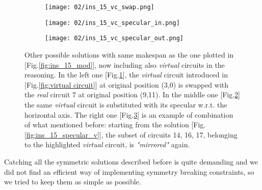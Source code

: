         \begin{figure}[H]
            \centering
            \begin{subfigure}[b]{0.3\textwidth}
                \centering 
                \texttt{[image: 02/ins\_15\_vc\_swap.png]}
                \caption{}
                \label{fig:vc_swap}
            \end{subfigure}
            \hfill
            \begin{subfigure}[b]{0.3\textwidth}
                \centering
                \texttt{[image: 02/ins\_15\_vc\_specular\_in.png]}
                \caption{}
                \label{fig:vc_specular_in}
            \end{subfigure}
            \hfill
            \begin{subfigure}[b]{0.3\textwidth}
                \centering
                \texttt{[image: 02/ins\_15\_vc\_specular\_out.png]}
                \caption{}
                \label{fig:vc_specular_out}
            \end{subfigure}
            \caption{
                Other possible solutions with same makespan as the one plotted in [Fig.\ref{fig:ins_15_mod}],
                now including also \textit{virtual} circuits in the reasoning.
                In the left one [Fig.\ref{fig:vc_swap}], the \textit{virtual} circuit introduced in [Fig.\ref{fig:virtual circuit}]
                at original position (3,0) is swapped with the \textit{real} circuit 7 at original position (9,11).
                In the middle one [Fig.\ref{fig:vc_specular_in}] the same \textit{virtual} circuit is substituted with 
                its specular w.r.t. the horizontal axis.
                The right one [Fig.\ref{fig:vc_specular_out}] is an example of combination of what mentioned before:
                starting from the solution [Fig.\ref{fig:ins_15_specular_v}], the subset of circuits 14, 16, 17, belonging to 
                the highlighted \textit{virtual} circuit, is \textit{"mirrored"} again.
            }
            \label{fig:symmetry_vc}
        \end{figure}

        Catching all the symmetric solutions described before is quite demanding and we did not find an 
        efficient way of implementing symmetry breaking constraints, so we tried to keep them as simple 
        as possible.

